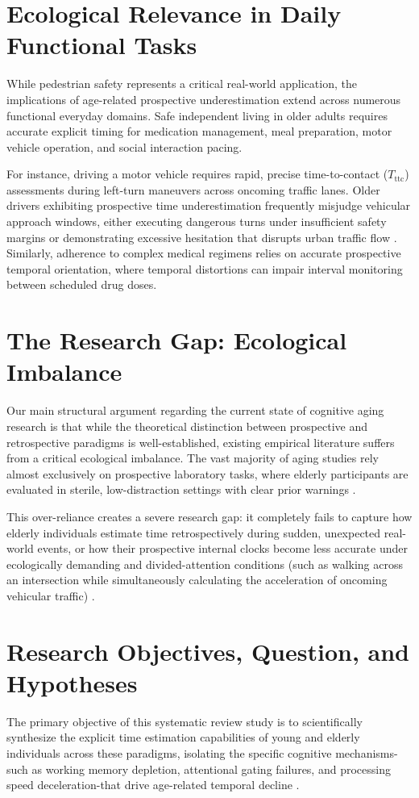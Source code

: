 \documentclass{custom_report}
\begin{document}
\section{Ecological Relevance in Daily Functional Tasks}
While pedestrian safety represents a critical real-world application, the implications of age-related prospective underestimation extend across numerous functional everyday domains. Safe independent living in older adults requires accurate explicit timing for medication management, meal preparation, motor vehicle operation, and social interaction pacing. 

For instance, driving a motor vehicle requires rapid, precise time-to-contact ($T_{\text{ttc}}$) assessments during left-turn maneuvers across oncoming traffic lanes. Older drivers exhibiting prospective time underestimation frequently misjudge vehicular approach windows, either executing dangerous turns under insufficient safety margins or demonstrating excessive hesitation that disrupts urban traffic flow \cite{Read2001}. Similarly, adherence to complex medical regimens relies on accurate prospective temporal orientation, where temporal distortions can impair interval monitoring between scheduled drug doses.

\section{The Research Gap: Ecological Imbalance}
Our main structural argument regarding the current state of cognitive aging research is that while the theoretical distinction between prospective and retrospective paradigms is well-established, existing empirical literature suffers from a critical ecological imbalance. The vast majority of aging studies rely almost exclusively on prospective laboratory tasks, where elderly participants are evaluated in sterile, low-distraction settings with clear prior warnings \cite{Craik1999}. 

This over-reliance creates a severe research gap: it completely fails to capture how elderly individuals estimate time retrospectively during sudden, unexpected real-world events, or how their prospective internal clocks become less accurate under ecologically demanding and divided-attention conditions (such as walking across an intersection while simultaneously calculating the acceleration of oncoming vehicular traffic) \cite{Carrigan2026}.

\section{Research Objectives, Question, and Hypotheses}
The primary objective of this systematic review study is to scientifically synthesize the explicit time estimation capabilities of young and elderly individuals across these paradigms, isolating the specific cognitive mechanisms-such as working memory depletion, attentional gating failures, and processing speed deceleration-that drive age-related temporal decline \cite{Baudouin2019, Turgeon2016}.
\end{document}
